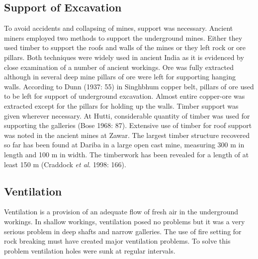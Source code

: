 \subsection*{Support of Excavation}

To avoid accidents and collapsing of mines, support was necessary. Ancient miners employed two methods to support the underground mines. Either they used timber to support the roofs and walls of the mines or they left rock or ore pillars. Both techniques were widely used in ancient India as it is evidenced by close examination of a number of ancient workings. Ore was fully extracted although in several deep mine pillars of ore were left for supporting hanging walls. According to Dunn (1937: 55) in Singhbhum copper belt, pillars of ore used to be left for support of underground excavation. Almost entire copper-ore was extracted except for the pillars for holding up the walls. Timber support was given wherever necessary. At Hutti, considerable quantity of timber was used for supporting the galleries (Bose 1968: 87). Extensive use of timber for roof support was noted in the ancient mines at Zawar. The largest timber structure recovered so far has been found at Dariba in a large open cast mine, measuring 300 m in length and 100 m in width. The timberwork has been revealed for a length of at least 150 m (Craddock \textit{et al}. 1998: 166).


\subsection*{Ventilation}

Ventilation is a provision of an adequate flow of fresh air in the underground workings. In shallow workings, ventilation posed no problems but it was a very serious problem in deep shafts and narrow galleries. The use of fire setting for rock breaking must have created major ventilation problems. To solve this problem ventilation holes were sunk at regular intervals.

